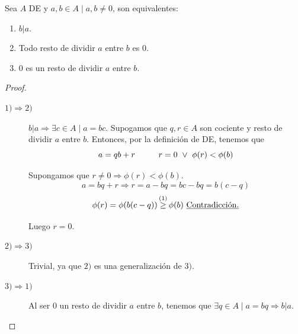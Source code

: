 \begin{prop}
    Sea $A$ DE y $a,b \in A \mid a,b \neq 0$, son equivalentes:
    \begin{enumerate}
        \item $b|a$.
        \item Todo resto de dividir $a$ entre $b$ es 0.
        \item 0 es un resto de dividir $a$ entre $b$.
    \end{enumerate}
\end{prop}
\begin{proof}\
\begin{description}
    \item [$1) \Longrightarrow 2)$]
    $b|a \Longrightarrow \exists c \in A \mid a=bc$.
    Supogamos que $q,r \in A$ son cociente y resto de dividir $a$ entre $b$. Entonces, por la definición de DE, tenemos que
    $$a=qb+r\hspace{1cm}r=0 \ \lor \  \phi(r) < \phi(b)$$

    Supongamos que $r\neq0 \Longrightarrow \phi(r)<\phi(b)$.
    $$a=bq+r \Longrightarrow r=a-bq = bc-bq = b(c-q)$$
    $$\phi(r) = \phi(b(c-q)) \mathop{\geq}^{(1)} \phi(b) \text{ \underline{Contradicción.}}$$

    Luego $r=0$.

    \item [$2) \Longrightarrow 3)$] Trivial, ya que $2)$ es una generalización de $3).$

    \item [$3) \Longrightarrow 1)$] Al ser $0$ un resto de dividir $a$ entre $b$, tenemos que $\exists q \in A \mid a = bq \Longrightarrow b|a$.
\end{description}
\end{proof}

